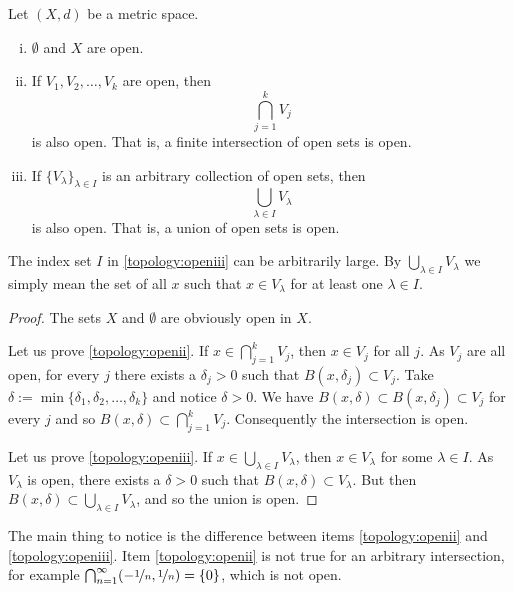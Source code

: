 \begin{prop} \label{prop:topology:open}
Let $(X,d)$ be a metric space.
\begin{enumerate}[(i)]
\item \label{topology:openi} $\emptyset$ and $X$ are open.
\item \label{topology:openii} If $V_1, V_2, \ldots, V_k$ are open, then
\begin{equation*}
\bigcap_{j=1}^k V_j
\end{equation*}
is also open.  That is, a finite intersection of open sets is open.
\item \label{topology:openiii} If $\{ V_\lambda \}_{\lambda \in I}$ is
an arbitrary collection of open sets, then
\begin{equation*}
\bigcup_{\lambda \in I} V_\lambda
\end{equation*}
is also open.  That is, a union of open sets is open.
\end{enumerate}
\end{prop}

The index set $I$ in \ref{topology:openiii} can be arbitrarily large.
By $\bigcup_{\lambda \in I} V_\lambda$ we simply mean the set of
all $x$ such that $x \in V_\lambda$ for at least one $\lambda \in I$.

\begin{proof}
The sets $X$ and $\emptyset$ are obviously open in $X$.

Let us prove \ref{topology:openii}.
If $x \in \bigcap_{j=1}^k V_j$, then $x \in V_j$ for all $j$.
As $V_j$ are all open, for every $j$ there exists a $\delta_j > 0$ 
such that $B(x,\delta_j) \subset V_j$.  Take $\delta := \min \{
\delta_1,\delta_2,\ldots,\delta_k \}$ and notice $\delta > 0$.  We have
$B(x,\delta) \subset B(x,\delta_j) \subset V_j$ for every $j$ and so
$B(x,\delta) \subset \bigcap_{j=1}^k V_j$.  Consequently the intersection is open.

Let us prove \ref{topology:openiii}.
If $x \in \bigcup_{\lambda \in I} V_\lambda$, then $x \in V_\lambda$ for some
$\lambda \in I$.
As $V_\lambda$ is open, there exists a $\delta > 0$
such that $B(x,\delta) \subset V_\lambda$.  But then
$B(x,\delta) \subset \bigcup_{\lambda \in I} V_\lambda$,
and so the union is open.
\end{proof}

\begin{example}
The main thing to notice is the difference between
items
\ref{topology:openii} and \ref{topology:openiii}.
Item \ref{topology:openii} is not true for an arbitrary intersection,
for example $\bigcap_{n=1}^\infty (-\nicefrac{1}{n},\nicefrac{1}{n}) = \{ 0
\}$, which is not open.
\end{example}


